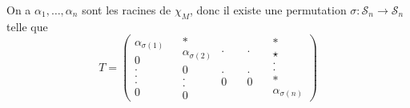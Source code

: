 On a $\alpha_1, \ldots, \alpha_n$ sont les racines de $\chi_M$, donc il existe
une permutation $\sigma : \mathcal{S}_n \rightarrow \mathcal{S}_n$ telle que
\[ T = \left( \begin{array}{c}
     \alpha_{\sigma (1)}\\
     0\\
     .\\
     .\\
     .\\
     0
   \end{array} \begin{array}{c}
     \\
     
   \end{array} \begin{array}{c}
     \ast\\
     \alpha_{\sigma (2)}\\
     0\\
     .\\
     .\\
     0
   \end{array}  \begin{array}{c}
     .\\
     \\
     \\
     \\
     .\\
     0
   \end{array} \quad \begin{array}{c}
     .\\
     \\
     \\
     \\
     .\\
     0
   \end{array} \quad \begin{array}{l}
     \ast\\
     \star\\
     .\\
     .\\
     \ast\\
     \alpha_{\sigma (n)}
   \end{array} \right) \]


